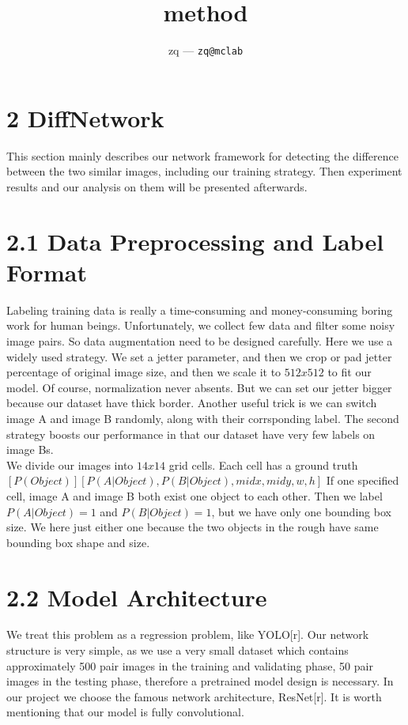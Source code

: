 \documentclass[12pt]{article}
\title{
	method
}
\author{
	zq --- \texttt{zq@mclab}
}
\begin{document}
\maketitle

\section{2 DiffNetwork}

This section mainly describes our network framework for detecting the difference between the two similar images, including our training strategy. Then experiment results and our analysis on them will be presented afterwards.\\

\section{2.1 Data Preprocessing and Label Format}

Labeling training data is really a time-consuming and money-consuming boring work for human beings. Unfortunately, we collect few data and filter some noisy image pairs. So data augmentation need to be designed carefully. Here we use a widely used strategy. We set a jetter parameter, and then we crop or pad jetter percentage of original image size, and then we scale it to $512x512$ to fit our model. Of course, normalization never absents. But we can set our jetter bigger because our dataset have thick border. Another useful trick is we can switch image A and image B randomly, along with their corrsponding label. The second strategy boosts our performance in that our dataset have very few labels on image Bs.\\

We divide our images into $14x14$ grid cells. Each cell has a ground truth $[P(Object)][P(A|Object), P(B|Object), midx, midy, w, h]$ If one specified cell, image A and image B both exist one object to each other. Then we label $P(A|Object)=1$ and $P(B|Object)=1$, but we have only one bounding box size. We here just either one because the two objects in the rough have same bounding box shape and size.\\


\section{2.2 Model Architecture}

We treat this problem as a regression problem, like YOLO[r]. Our network structure is very simple, as we use a very small dataset which contains approximately 500 pair images in the training and validating phase,  50 pair images in the testing phase, therefore a pretrained model design is necessary. In our project we choose the famous network architecture, ResNet[r]. It is worth mentioning that our model is fully convolutional.\\
\end{document}
